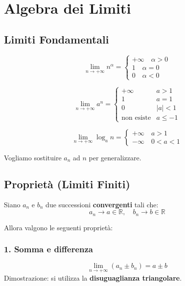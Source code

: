 





\section{Algebra dei Limiti}\label{algebra-de-limiti}

\subsection{Limiti Fondamentali}

\[
\lim_{n \to +\infty} n^{\alpha} = 
\begin{cases}
+\infty \quad \alpha>0\\ 
1 \quad \alpha=0\\ 
0 \quad \alpha<0
\end{cases}
\]

\[
\lim_{n \to +\infty} a^n = 
\begin{cases}
+\infty & a>1\\ 
1 & a=1\\ 
0 & |a|<1\\ 
\text{non esiste} & a \le -1
\end{cases}
\]

\[
\lim_{n \to +\infty} \log_a n = 
\begin{cases}
+\infty \quad a>1\\
-\infty \quad 0<a<1
\end{cases}
\]

Vogliamo sostituire \(a_n\) ad \(n\) per generalizzare.

\subsection{Proprietà (Limiti Finiti)}\label{proprietuxe0}

Siano \(a_n\) e \(b_n\) due successioni \textbf{convergenti} tali che:  
\[a_n \to a \in \mathbb{R}, \quad b_n \to b \in \mathbb{R}\]

Allora valgono le seguenti proprietà:
\subsubsection{1. Somma e differenza}
\[
\lim_{n \to +\infty} (a_n \pm b_n) = a \pm b
\]
Dimostrazione: si utilizza la \textbf{disuguaglianza triangolare}.

